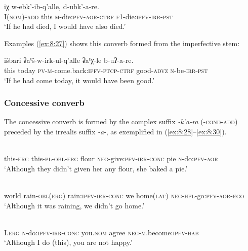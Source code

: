 ﻿\documentclass[output=paper]{langsci/langscibook}
\begin{document}
\ex \label{ex:8:26} %
 {iχ} {w-ebk'-ib-q'alle,} {d-ubk'-a-re.}\\
I(\textsc{nom})꞊\textsc{add} this \textsc{m}-die:\textsc{pfv}-\textsc{aor}-\textsc{ctrf} \textsc{f1}-die:\textsc{ipfv}-\textsc{irr}-\textsc{pst}\\
\glt `If he had died, I would have also died.' \citep{dobrushina2019}
\z

Examples (\ref{ex:8:27}) shows this converb formed from the imperfective
stem:

\ea \label{ex:8:27} %
 {išbari} {ʡaˤš-w-irk-ul-q'alle} {ʡaˤχ-le} {b-uʔ-a-re.}\\
this today \textsc{pv}-\textsc{m}-come.back:\textsc{ipfv}-\textsc{ptcp}-\textsc{ctrf} good-\textsc{advz} \textsc{n}-be-\textsc{irr}-\textsc{pst}\\
\glt `If he had come today, it would have been good.'
\citep{dobrushina2019} 
\z

\subsubsection{Concessive converb}

The concessive converb is formed by the complex suffix \emph{-k'a-ra}
(-\textsc{cond}-\textsc{add}) preceded by the irrealis suffix \emph{-a}-, as exemplified in (\ref{ex:8:28}–\ref{ex:8:30}).

\ea \label{ex:8:28} %
\\
this-\textsc{erg} this-\textsc{pl}-\textsc{obl}-\textsc{erg} flour \textsc{neg}-give:\textsc{pfv}-\textsc{irr}-\textsc{conc} pie \textsc{n}-do:\textsc{pfv}-\textsc{aor}\\
\glt `Although they didn't given her any flour, she baked a pie.'

\ex \label{ex:8:29} %
\\
world rain-\textsc{obl}(\textsc{erg}) rain:\textsc{ipfv}-\textsc{irr}-\textsc{conc} we home(\textsc{lat}) \textsc{neg}-\textsc{hpl}-go:\textsc{pfv}-\textsc{aor}-\textsc{ego}\\
\glt `Although it was raining, we didn't go home.'

\ex \label{ex:8:30} %
\\
I.\textsc{erg} \textsc{n}-do:\textsc{ipfv}-\textsc{irr}-\textsc{conc} you.\textsc{nom} agree \textsc{neg}-\textsc{m}.become:\textsc{ipfv}-\textsc{hab}\\
\glt `Although I do (this), you are not happy.' \citep{magometov1982}
\z
\end{document}
